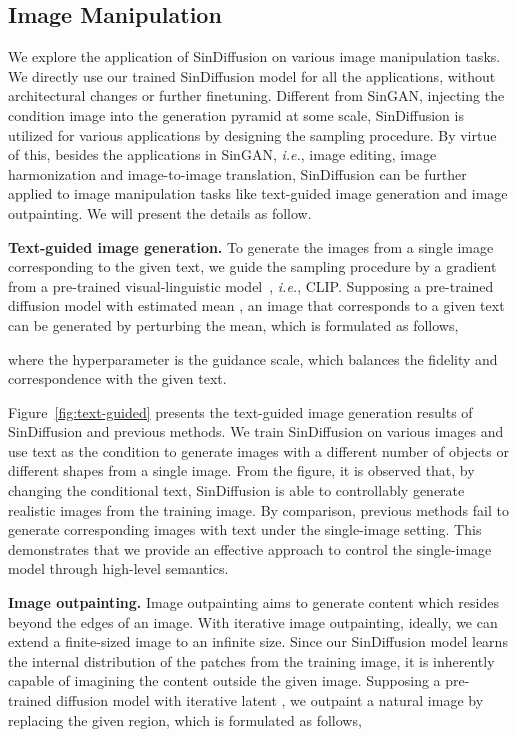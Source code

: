 \documentclass[10pt,twocolumn,letterpaper]{article}
\begin{document}
\subsection{Image Manipulation}
We explore the application of SinDiffusion on various image manipulation tasks.
We directly use our trained SinDiffusion model for all the applications, without architectural changes or further finetuning.
Different from SinGAN, injecting the condition image into the generation pyramid at some scale, SinDiffusion is utilized for various applications by designing the sampling procedure.
By virtue of this, besides the applications in SinGAN, \emph{i.e.}, image editing, image harmonization and image-to-image translation, SinDiffusion can be further applied to image manipulation tasks like text-guided image generation and image outpainting.
We will present the details as follow.

\noindent \textbf{Text-guided image generation.}
To generate the images from a single image corresponding to the given text, we guide the sampling procedure by a gradient from a pre-trained visual-linguistic model~, \emph{i.e.}, CLIP. 
Supposing a pre-trained diffusion model with estimated mean , an image that corresponds to a given text  can be generated by perturbing the mean, which is formulated as follows,

where the hyperparameter  is the guidance scale, which balances the fidelity and correspondence with the given text. 

Figure~\ref{fig:text-guided} presents the text-guided image generation results of SinDiffusion and previous methods.
We train SinDiffusion on various images and use text as the condition to generate images with a different number of objects or different shapes from a single image.
From the figure, it is observed that, by changing the conditional text, SinDiffusion is able to controllably generate realistic images from the training image. 
By comparison, previous methods fail to generate corresponding images with text under the single-image setting.
This demonstrates that we provide an effective approach to control the single-image model through high-level semantics.

\noindent \textbf{Image outpainting.}
Image outpainting aims to generate content which resides beyond the edges of an image.
With iterative image outpainting, ideally, we can extend a finite-sized image to an infinite size.
Since our SinDiffusion model learns the internal distribution of the patches from the training image, it is inherently capable of imagining the content outside the given image.
Supposing a pre-trained diffusion model with iterative latent , we outpaint a natural image  by replacing the given region, which is formulated as follows,
\end{document}

